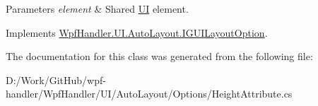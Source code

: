 \begin{DoxyParams}{Parameters}
{\em element} & Shared \mbox{\hyperlink{namespace_wpf_handler_1_1_u_i}{UI}} element.\\
\hline
\end{DoxyParams}


Implements \mbox{\hyperlink{interface_wpf_handler_1_1_u_i_1_1_auto_layout_1_1_i_g_u_i_layout_option_ac2d2fa8aeaf753b3248381399f991005}{Wpf\+Handler.\+U\+I.\+Auto\+Layout.\+I\+G\+U\+I\+Layout\+Option}}.



The documentation for this class was generated from the following file\+:\begin{DoxyCompactItemize}
\item 
D\+:/\+Work/\+Git\+Hub/wpf-\/handler/\+Wpf\+Handler/\+U\+I/\+Auto\+Layout/\+Options/Height\+Attribute.\+cs\end{DoxyCompactItemize}
